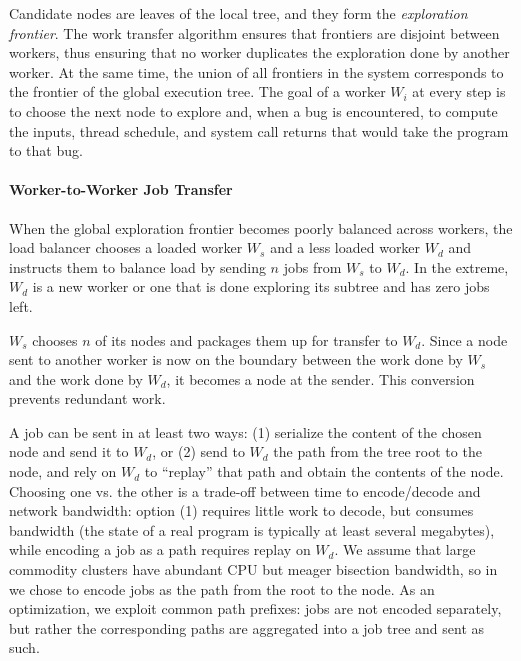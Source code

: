 Candidate nodes are leaves of the local tree, and they form the \emph{exploration frontier}.  The work transfer algorithm ensures that frontiers are disjoint between workers, thus ensuring that no worker duplicates the exploration done by another worker.  At the same time, the union of all frontiers in the system corresponds to the frontier of the global execution tree. The goal of a worker  $W_i$ at every step is to choose the next \candidate node to explore and, when a bug is encountered, to compute the inputs, thread schedule, and system call returns that would take the program to that bug.

\paragraph{Worker-to-Worker Job Transfer}
\label{sec:workTransfer}

\newcommand{\wsrc}{\ensuremath{W_s}\xspace}
\newcommand{\wdst}{\ensuremath{W_d}\xspace}

When the global exploration frontier becomes poorly balanced across workers, the load balancer chooses a loaded worker \wsrc and a less loaded worker \wdst  and instructs them to balance load by sending $n$ jobs from \wsrc to \wdst.  In the extreme, \wdst is a new worker or one that is done exploring its subtree and has zero jobs left.  

\wsrc chooses $n$ of its \candidate nodes and packages them up for transfer to \wdst.  Since a \candidate node sent to another worker is now on the boundary between the work done by \wsrc and the work done by \wdst, it becomes a \fence node at the sender.  This conversion prevents redundant work.

A job can be sent in at least two ways: (1) serialize the content of the chosen node and send it to \wdst, or (2) send to \wdst the path from the tree root to the node, and rely on \wdst to ``replay'' that path and obtain the contents of the node.  Choosing one vs. the other is a trade-off between time to encode/decode and network bandwidth: option (1) requires little work to decode, but consumes bandwidth (the state of a real program is typically at least several megabytes), while encoding a job as a path requires replay on \wdst.  We assume that large commodity clusters have abundant CPU but meager bisection bandwidth,
so in \cnine we chose to encode jobs as the path from the root to the \candidate node.  As an optimization, we exploit common path prefixes: jobs are not encoded separately, but rather the corresponding paths are aggregated into a job tree and sent as such.

